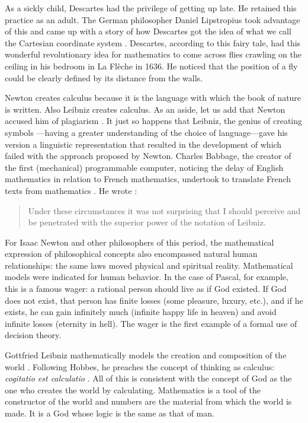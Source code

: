 \documentclass[pdftex,12pt]{article}
\begin{document}
As a sickly child, Descartes had the privilege of getting up late. He retained this practice as an adult. The German philosopher Daniel Lipstropius took advantage of this and came up with a story of how Descartes got the idea of what we call the Cartesian coordinate system \parencite[pp.111--112] {Mazur2014}. Descartes, according to this fairy tale, had this wonderful revolutionary idea for mathematics to come across flies crawling on the ceiling in his bedroom in La Flèche in 1636. He noticed that the position of a fly could be clearly defined by its distance from the walls.

Newton creates calculus because it is the language with which the book of nature is written. Also Leibniz creates calculus. As an aside, let us add that Newton accused him of plagiarism \parencite{Sonar2018}. It just so happens that Leibniz, the genius of creating symbols \parencite['The Symbol Master', cf.][pp.165--168]{Mazur2014}---having a greater understanding of the choice of language---gave his version a linguistic representation that resulted in the development of which failed with the approach proposed by Newton. Charles Babbage, the creator of the first (mechanical) programmable computer, noticing the delay of English mathematics in relation to French mathematics, undertook to translate French texts from mathematics \parencite{Trzesicki2006c}. He wrote \parencite*{Babbage1864,Babbage2008}: \begin{quote} \small Under these circumstances it was not surprising that I should perceive and be penetrated with the superior power of the notation of Leibniz.  \end{quote}

For Isaac Newton and other philosophers of this period, the mathematical expression of philosophical concepts also encompassed natural human relationships: the same laws moved physical and spiritual reality. Mathematical models were indicated for human behavior. In the case of Pascal, for example, this is a famous wager: a rational person should live as if God existed. If God does not exist, that person has finite losses (some pleasure, luxury, etc.), and if he exists, he can gain infinitely much (infinite happy life in heaven) and avoid infinite losses (eternity in hell). The wager is the first example of a formal use of decision theory.

Gottfried Leibniz \parencite*{list1697,Leibniz1679} mathematically models the creation and composition of the world  \parencite{Trzesicki2006c,Trzesicki2006b,Trzesicki2020a}. Following Hobbes, he preaches the concept of thinking as calculus: \emph{cogitatio est calculatio} \parencite{Leibniz1666}. All of this is consistent with the concept of God as the one who creates the world by calculating. Mathematics is a tool of the constructor of the world and numbers are the material from which the world is made. It is a God whose logic is the same as that of man.
\end{document}
